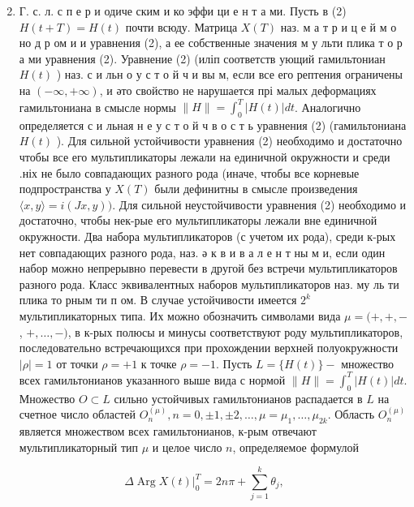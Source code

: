 \documentclass[10pt]{article}
\begin{document}
\begin{enumerate}

  \setcounter{enumi}{1}

  \item Г. с. л. с п е р и одиче ским и ко эффи ци е н т а ми. Пусть в (2) $H(t+T)=H(t)$ почти всюду. Матрица $X(T)$ наз. м а т р и ц е й м о но д р ом и и уравнения (2), а ее собственные значения м у льти плика т о р а ми уравнения (2). Уравнение (2) (иліп соответств ующий гамильтониан $H(t)$ ) наз. с и льн о у с т о й ч и вы м, если все его рептения ограничены на $(-\infty,+\infty)$, и әто свойство не нарушается прі малых деформациях гамильтониана в смысле нормы $\|H\|=\int_{0}^{T}|H(t)| d t$. Аналогично определяется с и льная н е у с т о й ч в о с т ь уравнения (2) (гамильтониана $H(t)$ ). Для сильной устойчивости уравнения (2) необходимо и достаточно чтобы все его мультипликаторы лежали на единичной окружности и среди .ніх не было совпадающих разного рода (иначе, чтобы все корневые подпространства у $X(T)$ были дефинитны в смысле произведения $\langle x, y\rangle=i(J x, y))$. Для сильной неустойчивости уравнения (2) необходимо и достаточно, чтобы нек-рые его мультипликаторы лежали вне единичной окружности. Два набора мультипликаторов (с учетом их рода), среди к-рых нет совпадающих разного рода, наз. ә к в и в а л е н т ны м и, если один набор можно непрерывно перевести в другой без встречи мультипликаторов разного рода. Класс эквивалентных наборов мультипликаторов наз. му ль ти плика то рным ти п ом. В случае устойчивости имеется $2^{k}$ мультипликаторных типа. Их можно обозначить символами вида $\mu=(+,+,-$, $+, \ldots,-)$, в к-рых полюсы и минусы соответствуют роду мультипликаторов, последовательно встречающихся при прохождении верхней полуокружности $|\rho|=1$ от точки $\rho=+1$ к точке $\rho=-1$. Пусть $L=\{H(t)\}-$ множество всех гамильтонианов указанного выше вида с нормой $\|H\|=\int_{0}^{T}|H(t)| d t$. Множество $O \subset L$ сильно устойчивых гамильтонианов распадается в $L$ на счетное число областей $O_{n}^{(\mu)}, n=0, \pm 1, \pm 2, \ldots, \mu=\mu_{1}, \ldots, \mu_{2 k}$. Область $O_{n}^{(\mu)}$ является множеством всех гамильтонианов, к-рым отвечают мультипликаторный тип $\mu$ и целое число $n$, определяемое формулой

\end{enumerate}



\[

\left.\Delta \operatorname{Arg} X(t)\right|_{0} ^{T}=2 n \pi+\sum_{j=1}^{k} \theta_{j},

\]
\end{document}
